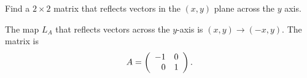 \documentclass{ximera}
\begin{document}
\begin{exercise} \label{c4.2.2b}
Find a $2\times 2$ matrix that reflects vectors in the $(x,y)$ plane across
the $y$ axis.

\begin{solution}
\soln The map $L_A$ that reflects vectors across the $y$-axis is
$(x,y) \rightarrow (-x,y)$.  The matrix is
\[
A = \left(\begin{array}{rr} -1 & 0\\ 0 &1\end{array}\right).
\]

\end{solution}
\end{exercise}
\end{document}
